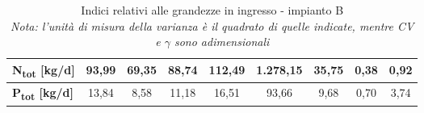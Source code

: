\begin{sidewaystable}[h]
\begin{center}
\begin{tabular}{l|c|c|c|c|c|c|c|c|}
		\multicolumn{1}{|l|}{\textbf{N\textsubscript{tot} {[}kg/d{]}}}          & 93,99          & 69,35                   & 88,74            & 112,49                  & 1.278,15     & 35,75      & 0,38        & 0,92           \\ \hline
		\multicolumn{1}{|l|}{\textbf{P\textsubscript{tot} {[}kg/d{]}}}          & 13,84          & 8,58                    & 11,18            & 16,51                   & 93,66        & 9,68       & 0,70        & 3,74           \\ \hline
	\end{tabular}
	\end{center}
	\caption{Indici relativi alle grandezze in ingresso - impianto B\\ \textit{Nota: l'unità di misura della varianza è il quadrato di quelle indicate, mentre CV e $\gamma$ sono adimensionali}}
	\label{tab:c_indici_in}
\end{sidewaystable}


